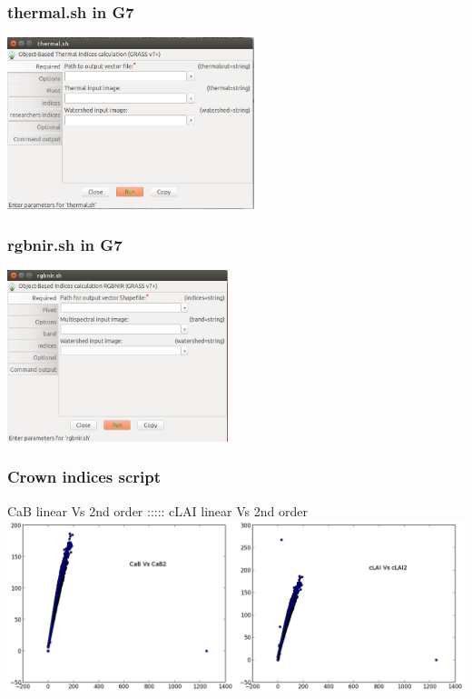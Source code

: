 \documentclass[serif,mathserif,aspectratio=169]{beamer}
\begin{document}

\begin{frame}
  \frametitle{thermal.sh in G7}
\begin{center}
\includegraphics[height=5cm]{G7_thermal_sh}
\end{center}
\end{frame}


\begin{frame}
  \frametitle{rgbnir.sh in G7}
\begin{center}
\includegraphics[height=5cm]{G7_rgbnir_sh}
\end{center}
\end{frame}


\begin{frame}
  \frametitle{Crown indices script}
\begin{center}
CaB linear Vs 2nd order ::::: cLAI linear Vs 2nd order\\
\bigskip
\includegraphics[height=5cm]{pt598000-4413000_CaB_and_cLAI_comp}
\end{center}
\end{frame}
\end{document}
